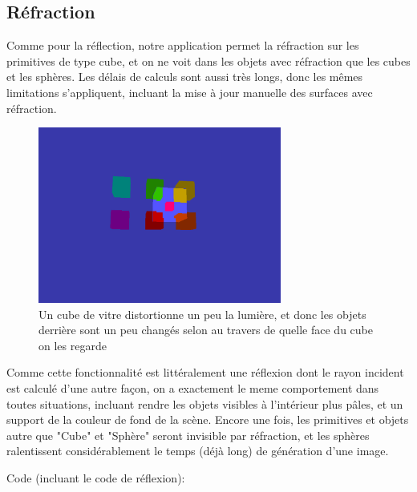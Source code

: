 \newpage

\subsection{Réfraction}
Comme pour la réflection, notre application permet la réfraction sur les primitives de type cube, et on ne voit dans les objets avec réfraction que les cubes et les sphères. Les délais de calculs sont aussi très longs, donc les mêmes limitations s'appliquent, incluant la mise à jour manuelle des surfaces avec réfraction.

\begin{figure}[h]
	\centering
	\includegraphics[width=8cm]{fig/CubeRefraction.png}
	\caption{Un cube de vitre distortionne un peu la lumière, et donc les objets derrière sont un peu changés selon au travers de quelle face du cube on les regarde}
	\label{fig:propriete}
\end{figure}

\smallskip

Comme cette fonctionnalité est littéralement une réflexion dont le rayon incident est calculé d'une autre façon, on a exactement le meme comportement dans toutes situations, incluant rendre les objets visibles à l'intérieur plus pâles, et un support de la couleur de fond de la scène. Encore une fois, les primitives et objets autre que "Cube" et "Sphère" seront invisible par réfraction, et les sphères ralentissent considérablement le temps (déjà long) de génération d'une image.

Code (incluant le code de réflexion):

